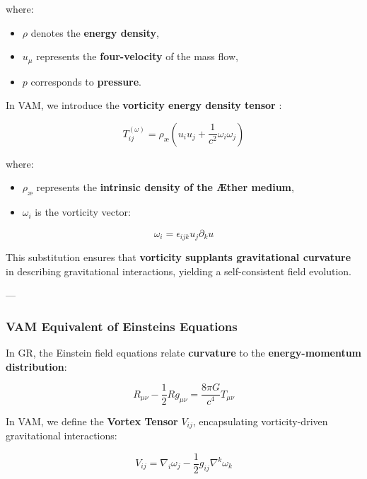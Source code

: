 where:
\begin{itemize}
    \item $\rho$ denotes the \textbf{energy density},
    \item $u_\mu$ represents the \textbf{four-velocity} of the mass flow,
    \item $p$ corresponds to \textbf{pressure}.
\end{itemize}

In VAM, we introduce the \textbf{vorticity energy density tensor} \cite{thomson_vortex}:



\begin{equation*}
    T^{(\omega)}_{ij} = \rho_\text{\ae} \left( u_i u_j + \frac{1}{c^2} \omega_i \omega_j \right)
\end{equation*}


where:
\begin{itemize}
    \item $\rho_\text{\ae}$ represents the \textbf{intrinsic density of the Æther medium},
    \item $\omega_i$ is the vorticity vector:
\end{itemize}


\begin{equation*}
    \omega_i = \epsilon_{ijk} u_j \partial_k u
\end{equation*}

This substitution ensures that \textbf{vorticity supplants gravitational curvature} in describing gravitational interactions, yielding a self-consistent field evolution.



---

\subsubsection*{VAM Equivalent of Einstein\rqs s Equations}
In GR, the Einstein field equations relate \textbf{curvature} to the \textbf{energy-momentum distribution}:

\begin{equation*}
    R_{\mu\nu} - \frac{1}{2} R g_{\mu\nu} = \frac{8\pi G}{c^4} T_{\mu\nu}
\end{equation*}


In VAM, we define the \textbf{Vortex Tensor} $V_{ij}$, encapsulating vorticity-driven gravitational interactions:

\begin{equation*}
    V_{ij} = \nabla_i \omega_j - \frac{1}{2} g_{ij} \nabla^k \omega_k
\end{equation*}



